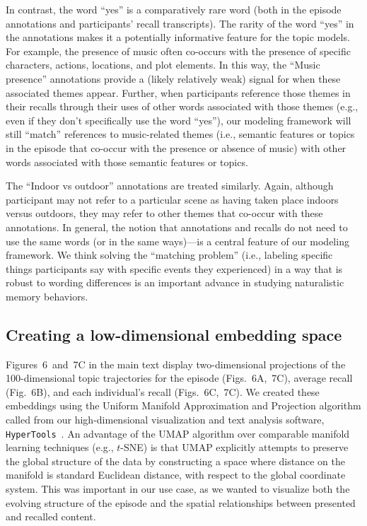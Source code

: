\documentclass{article}
\newcommand{\trajectories}{6}
\newcommand{\wordles}{7}
\begin{document}
In contrast, the word ``yes'' is a comparatively rare word (both in the episode annotations and participants’ recall transcripts). The rarity of the word ``yes'' in the annotations makes it a potentially informative feature for the topic models.  For example, the presence of music often co-occurs with the presence of specific characters, actions, locations, and plot elements.  In this way, the ``Music presence'' annotations provide a (likely relatively weak) signal for when these associated themes appear.  Further, when participants reference those themes in their recalls through their uses of other words associated with those themes (e.g., even if they don’t specifically use the word ``yes''), our modeling framework will still ``match'' references to music-related themes (i.e., semantic features or topics in the episode that co-occur with the presence or absence of music) with other words associated with those semantic features or topics.


The ``Indoor vs outdoor'' annotations are treated similarly.  Again, although participant may not refer to a particular scene as having taken place indoors versus outdoors, they may refer to other themes that co-occur with these annotations.  In general, the notion that annotations and recalls do not need to use the same words (or in the same ways)—is a central feature of our modeling framework.  We think solving the ``matching problem'' (i.e., labeling specific things participants say with specific events they experienced) in a way that is robust to wording differences is an important advance in studying naturalistic memory behaviors.

\subsection*{Creating a low-dimensional embedding space}
Figures~\trajectories~and~\wordles C in the main text display two-dimensional projections of the 100-dimensional topic trajectories for the episode (Figs.~\trajectories A,~\wordles C), average recall (Fig.~\trajectories B), and each individual's recall (Figs.~\trajectories C,~\wordles C).  We created these embeddings using the Uniform Manifold Approximation and Projection algorithm \citep[UMAP;][]{McInEtal18} called from our high-dimensional visualization and text analysis software, \texttt{HyperTools}~\citep{HeusEtal18a}.  An advantage of the UMAP algorithm over comparable manifold learning techniques (e.g., $t$-SNE) is that UMAP explicitly attempts to preserve the global structure of the data \citep{McInEtal18,BechEtal19} by constructing a space where distance on the manifold is standard Euclidean distance, with respect to the global coordinate system.  This was important in our use case, as we wanted to visualize both the evolving structure of the episode and the spatial relationships between presented and recalled content.
\end{document}
